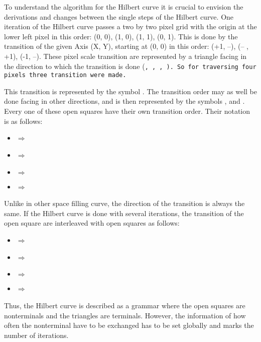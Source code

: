 To understand the algorithm for the Hilbert curve it is crucial to envision the derivations and changes between the single steps of the Hilbert curve. One iteration of the Hilbert curve passes a two by two pixel grid with the origin at the lower left pixel in this order: (0, 0), (1, 0), (1, 1), (0, 1). This is done by the transition of the given Axis (X, Y), starting at (0, 0) in this order: (+1, --), (-- , +1), (-1, --). These pixel scale transition are represented by a triangle facing in the direction to which the transition is done (\tt, \tl, \tb, \tr). So for traversing four pixels three transition were made.

This transition is represented by the symbol \sqr. The transition order may as well be done facing in other directions, and is then represented by the symbols \sqt, \sql and \sqb. Every one of these open squares have their own transition order. Their notation is as follows:

\begin{itemize}%
   \item \sqr $\Rightarrow$ \tr \tt \tl
   \item \sqt $\Rightarrow$ \tt \tr \tb
   \item \sql $\Rightarrow$ \tl \tb \tr
   \item \sqb $\Rightarrow$ \tb \tl \tt
\end{itemize}%

Unlike in other space filling curve, the direction of the transition is always the same. If the Hilbert curve is done with several iterations, the transition of the open square are interleaved with open squares as follows:

\begin{itemize}%
   \item \sqr $\Rightarrow$ \sqt  \tr  \sqr  \tt  \sqr  \tl \sqb
   \item \sqt $\Rightarrow$ \sqr  \tt  \sqt  \tr  \sqt  \tb  \sql
   \item \sql $\Rightarrow$ \sqb  \tl  \sql  \tb  \sql  \tr  \sqt
   \item \sqb $\Rightarrow$ \sql  \tb  \sqb  \tl  \sqb  \tt  \sqr
\end{itemize}%

Thus, the Hilbert curve is described as a grammar where the open squares are nonterminals and the triangles are terminals. However, the information of how often the nonterminal have to be exchanged has to be set globally and marks the number of iterations.


